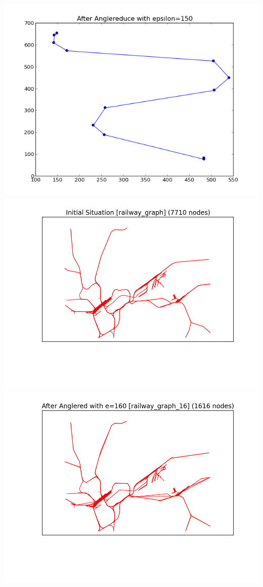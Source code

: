 \documentclass[twoside]{scrartcl}
\begin{document}
\includegraphics[scale=0.48]{simp-3.png}\\
\includegraphics[scale=0.49]{anglered-1.png}
\includegraphics[scale=0.49]{anglered-2.png}
\end{document}
